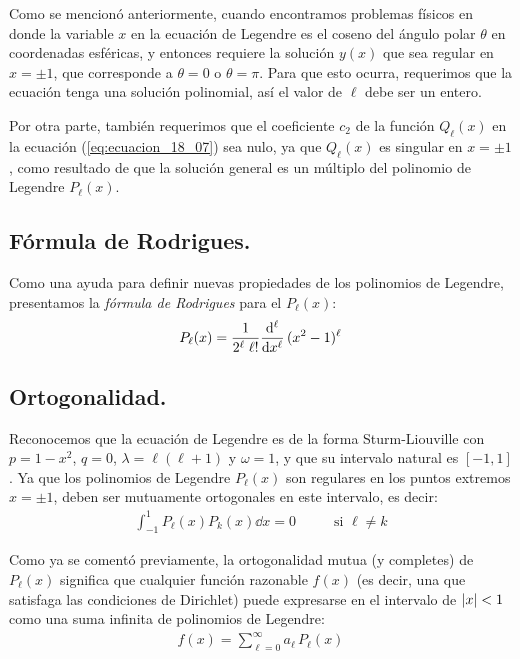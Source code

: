 Como se mencionó anteriormente, cuando encontramos problemas físicos en donde la variable $x$ en la ecuación de Legendre es el coseno del ángulo polar $\theta$ en coordenadas esféricas, y entonces requiere la solución $y(x)$ que sea regular en $x = \pm 1$, que corresponde a $\theta = 0$ o $\theta = \pi$. Para que esto ocurra, requerimos que la ecuación tenga una solución polinomial, así el valor de $\ell$ debe ser un entero.
\par
Por otra parte, también requerimos que el coeficiente $c_{2}$ de la función $Q_{\ell}(x)$ en la ecuación (\ref{eq:ecuacion_18_07}) sea nulo, ya que $Q_{\ell}(x)$ es singular en $x = \pm 1$, como resultado de que la solución general es un múltiplo del polinomio de Legendre $P_{\ell}(x)$.

\subsection{Fórmula de Rodrigues.}

Como una ayuda para definir nuevas propiedades de los polinomios de Legendre, presentamos la \emph{fórmula de Rodrigues} para el $P_{\ell} (x)$:
\begin{align}
P_{\ell} (x) = \dfrac{1}{2^{\ell} \; \ell !} \dv[\ell]{x} \, (x^{2} - 1)^{\ell}
\label{eq:ecuacion_18_09}
\end{align}

\subsection{Ortogonalidad.}

Reconocemos que la ecuación de Legendre es de la forma Sturm-Liouville con $p = 1 - x^{2}$, $q = 0$, $\lambda = \ell (\ell + 1)$ y $\omega = 1$, y que su intervalo natural es $[-1, 1]$. Ya que los polinomios de Legendre $P_{\ell} (x)$ son regulares en los puntos extremos $x = \pm 1$, deben ser mutuamente ortogonales en este intervalo, es decir:
\begin{align}
\int_{-1}^{1} P_{\ell}(x) P_{k}(x) \dd{x} = 0 \hspace{1cm} \mbox{ si $\ell \neq k$}
\label{eq:ecuacion_18_12}
\end{align}

Como ya se comentó previamente, la ortogonalidad mutua (y completes) de $P_{\ell} (x)$ significa que cualquier función razonable $f(x)$ (es decir, una que satisfaga las condiciones de Dirichlet) puede expresarse en el intervalo de $\abs{x} < 1$ como una suma infinita de polinomios de Legendre:
\begin{align}
f(x) = \sum_{\ell = 0}^{\infty} a_{\ell} \, P_{\ell} (x)
\label{eq:ecuacion_013}
\end{align}

